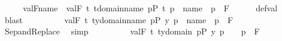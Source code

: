 \begin{isabellebody}
\isamarkupfalse%
\ {\isacharminus}{\kern0pt}\isanewline
\ \ \isamarkupfalse%
\ {\isachardoublequoteopen}val{\isacharparenleft}{\kern0pt}F{\isacharcomma}{\kern0pt}{\isacharquery}{\kern0pt}name{\isacharparenright}{\kern0pt}\ {\isacharequal}{\kern0pt}\ {\isacharbraceleft}{\kern0pt}val{\isacharparenleft}{\kern0pt}F{\isacharcomma}{\kern0pt}\ t{\isacharparenright}{\kern0pt}{\isachardot}{\kern0pt}{\isachardot}{\kern0pt}\ t{\isasymin}domain{\isacharparenleft}{\kern0pt}{\isacharquery}{\kern0pt}name{\isacharparenright}{\kern0pt}{\isacharcomma}{\kern0pt}\ {\isasymexists}p{\isasymin}P{\isachardot}{\kern0pt}\ {\isasymlangle}t{\isacharcomma}{\kern0pt}\ p{\isasymrangle}\ {\isasymin}\ {\isacharquery}{\kern0pt}name\ {\isasymand}\ p\ {\isasymin}\ F{\isacharbraceright}{\kern0pt}{\isachardoublequoteclose}\isanewline
\ \ \ \ \isamarkupfalse%
\ def{\isacharunderscore}{\kern0pt}val\ \isamarkupfalse%
\ blast\isanewline
\ \ \isamarkupfalse%
\isanewline
\ \ \isamarkupfalse%
\ {\isachardoublequoteopen}\ {\isachardot}{\kern0pt}{\isachardot}{\kern0pt}{\isachardot}{\kern0pt}\ {\isacharequal}{\kern0pt}\ {\isacharbraceleft}{\kern0pt}val{\isacharparenleft}{\kern0pt}F{\isacharcomma}{\kern0pt}\ t{\isacharparenright}{\kern0pt}{\isachardot}{\kern0pt}\ t{\isasymin}{\isacharbraceleft}{\kern0pt}y{\isasymin}domain{\isacharparenleft}{\kern0pt}{\isacharquery}{\kern0pt}name{\isacharparenright}{\kern0pt}{\isachardot}{\kern0pt}\ {\isasymexists}p{\isasymin}P{\isachardot}{\kern0pt}\ {\isasymlangle}y{\isacharcomma}{\kern0pt}\ p{\isasymrangle}\ {\isasymin}\ {\isacharquery}{\kern0pt}name\ {\isasymand}\ p\ {\isasymin}\ F{\isacharbraceright}{\kern0pt}{\isacharbraceright}{\kern0pt}{\isachardoublequoteclose}\isanewline
\ \ \ \ \isamarkupfalse%
\ Sep{\isacharunderscore}{\kern0pt}and{\isacharunderscore}{\kern0pt}Replace\ \isamarkupfalse%
\ simp\isanewline
\ \ \isamarkupfalse%
\isanewline
\ \ \isamarkupfalse%
\ {\isachardoublequoteopen}\ {\isachardot}{\kern0pt}{\isachardot}{\kern0pt}{\isachardot}{\kern0pt}\ {\isacharequal}{\kern0pt}\ {\isacharbraceleft}{\kern0pt}val{\isacharparenleft}{\kern0pt}F{\isacharcomma}{\kern0pt}\ t{\isacharparenright}{\kern0pt}{\isachardot}{\kern0pt}\ t{\isasymin}{\isacharbraceleft}{\kern0pt}y{\isasymin}domain{\isacharparenleft}{\kern0pt}{\isasymtau}{\isacharparenright}{\kern0pt}{\isachardot}{\kern0pt}\ {\isasymexists}p{\isasymin}P{\isachardot}{\kern0pt}\ {\isasymlangle}y{\isacharcomma}{\kern0pt}\ p{\isasymrangle}\ {\isasymin}\ {\isasymtau}\ {\isasymand}\ p\ {\isasymin}\ F{\isacharbraceright}{\kern0pt}{\isacharbraceright}{\kern0pt}{\isachardoublequoteclose}\isanewline

\end{isabellebody}

